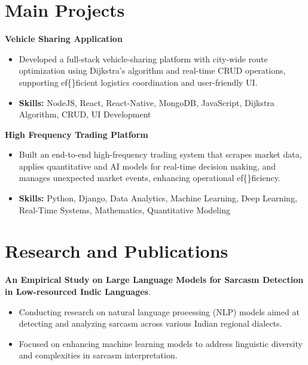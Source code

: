 \documentclass[a4paper,11pt]{article}
\begin{document}
\section{\textbf{Main Projects}}

\vspace{1mm}
  \textbf{Vehicle Sharing Application  }
\vspace{-1.5mm} %
\begin{itemize}
  \item Developed a full-stack vehicle-sharing platform with city-wide route optimization using Dijkstra's algorithm and real-time CRUD operations, supporting ef\{\}ficient logistics coordination and user-friendly UI.
\vspace{-3mm}
  \item \textbf{Skills:} NodeJS, React, React-Native, MongoDB, JavaScript, Dijkstra Algorithm, CRUD, UI Development
\end{itemize}


\vspace{1mm}
   \textbf{High Frequency Trading Platform }
\vspace{-1.5mm} %
\begin{itemize}
  \item Built an end-to-end high-frequency trading system that scrapes market data, applies quantitative and AI models for real-time decision making, and manages unexpected market events, enhancing operational ef\{\}ficiency.
\vspace{-3mm}
  \item \textbf{Skills:} Python, Django, Data Analytics, Machine Learning, Deep Learning, Real-Time Systems, Mathematics, Quantitative Modeling
\end{itemize}



\section{\textbf{Research and Publications} \hfill }
\vspace{1mm}
  \textbf{An Empirical Study on Large Language Models for Sarcasm Detection in Low-resourced Indic Languages}.
\vspace{-1mm} %
\begin{itemize}
  \item Conducting research on natural language processing (NLP) models aimed at detecting and analyzing sarcasm across various Indian regional dialects.
\vspace{-3mm}
  \item Focused on enhancing machine learning models to address linguistic diversity and complexities in sarcasm interpretation.
\end{itemize}
\end{document}
